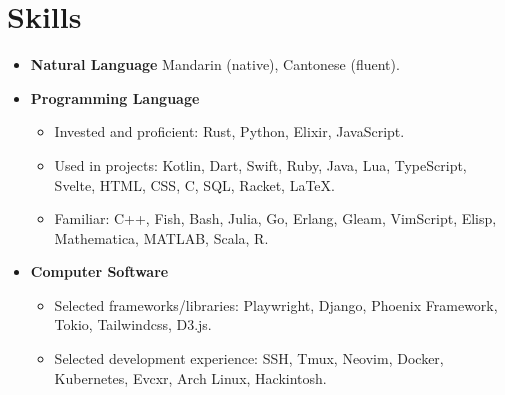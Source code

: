 \documentclass[letterpaper,11pt]{article}
\begin{document}
\section{Skills}
\begin{itemize}[leftmargin=0.5cm, label={}]
    \item \textbf{Natural Language}\quad
    Mandarin (native), Cantonese (fluent).\vspace{-4pt}
    \item \textbf{Programming Language}\vspace{-4pt}
    \begin{itemize}\small
        \item Invested and proficient: Rust, Python, Elixir, JavaScript.
        \item Used in projects:
        Kotlin, Dart, Swift, Ruby, Java, Lua, TypeScript,
        Svelte, HTML, CSS, C, SQL, Racket, \LaTeX{}.
        \item Familiar: C++, Fish, Bash, Julia, Go, Erlang, Gleam, VimScript, Elisp,
        Mathematica, MATLAB, Scala, R.\vspace{-4pt}
    \end{itemize}
    \item \textbf{Computer Software}\vspace{-4pt}
    \begin{itemize}\small
        \item Selected frameworks/libraries: Playwright, Django,
        Phoenix Framework, Tokio, Tailwindcss, D3.js.
        \item Selected development experience: SSH, Tmux, Neovim, Docker,
        Kubernetes, Evcxr, Arch Linux, Hackintosh.
    \end{itemize}
\end{itemize}
\end{document}
